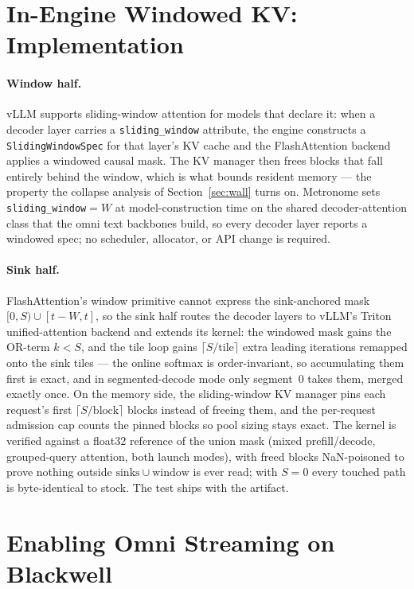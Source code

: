 \appendix

\section{In-Engine Windowed KV: Implementation}
\label{app:window}

\paragraph{Window half.} vLLM supports sliding-window attention for models that declare it: when a
decoder layer carries a \texttt{sliding\_window} attribute, the engine constructs a
\texttt{SlidingWindowSpec} for that layer's KV cache and the FlashAttention
backend~\citep{flashattn,flashattn2,flashinfer} applies a windowed causal mask. The KV manager then
frees blocks that fall entirely behind the window, which is what bounds resident memory --- the
property the collapse analysis of Section~\ref{sec:wall} turns on. Metronome sets
\texttt{sliding\_window}${=}W$ at model-construction time on the shared decoder-attention class that
the omni text backbones build, so every decoder layer reports a windowed spec; no scheduler,
allocator, or API change is required.

\paragraph{Sink half.} FlashAttention's window primitive cannot express the sink-anchored mask
$[0,S) \cup [t{-}W,t]$, so the sink half routes the decoder layers to vLLM's Triton unified-attention
backend and extends its kernel: the windowed mask gains the OR-term $k < S$, and the tile loop gains
$\lceil S/\mathrm{tile} \rceil$ extra leading iterations remapped onto the sink tiles --- the online
softmax is order-invariant, so accumulating them first is exact, and in segmented-decode mode only
segment~0 takes them, merged exactly once. On the memory side, the sliding-window KV manager pins each
request's first $\lceil S/\mathrm{block} \rceil$ blocks instead of freeing them, and the per-request
admission cap counts the pinned blocks so pool sizing stays exact. The kernel is verified against a
float32 reference of the union mask (mixed prefill/decode, grouped-query attention, both launch modes),
with freed blocks NaN-poisoned to prove nothing outside $\mathrm{sinks} \cup \mathrm{window}$ is ever
read; with $S{=}0$ every touched path is byte-identical to stock. The test ships with the artifact.

\section{Enabling Omni Streaming on Blackwell}
\label{app:fixes}

